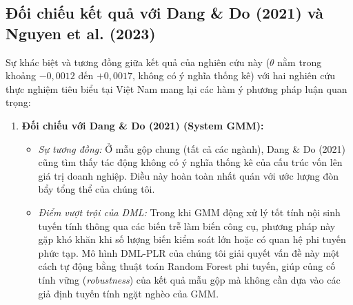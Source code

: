 \documentclass[12pt,a4paper]{article}
\begin{document}
\subsection{Đối chiếu kết quả với Dang \& Do (2021) và Nguyen et al. (2023)}
Sự khác biệt và tương đồng giữa kết quả của nghiên cứu này ($\theta$ nằm trong khoảng $-0,0012$ đến $+0,0017$, không có ý nghĩa thống kê) với hai nghiên cứu thực nghiệm tiêu biểu tại Việt Nam mang lại các hàm ý phương pháp luận quan trọng:
\begin{enumerate}
    \item \textbf{Đối chiếu với Dang \& Do (2021) (System GMM):}
    \begin{itemize}
        \item \textit{Sự tương đồng:} Ở mẫu gộp chung (tất cả các ngành), Dang \& Do (2021) cũng tìm thấy tác động không có ý nghĩa thống kê của cấu trúc vốn lên giá trị doanh nghiệp. Điều này hoàn toàn nhất quán với ước lượng đòn bẩy tổng thể của chúng tôi.
        \item \textit{Điểm vượt trội của DML:} Trong khi GMM động xử lý tốt tính nội sinh tuyến tính thông qua các biến trễ làm biến công cụ, phương pháp này gặp khó khăn khi số lượng biến kiểm soát lớn hoặc có quan hệ phi tuyến phức tạp. Mô hình DML-PLR của chúng tôi giải quyết vấn đề này một cách tự động bằng thuật toán Random Forest phi tuyến, giúp củng cố tính vững (\textit{robustness}) của kết quả mẫu gộp mà không cần dựa vào các giả định tuyến tính ngặt nghèo của GMM.
    \end{itemize}
    

\end{enumerate}
\end{document}
